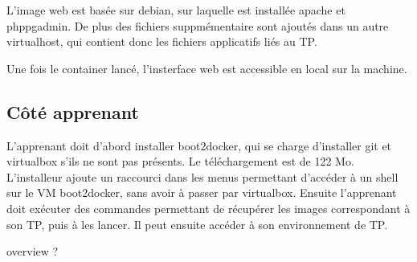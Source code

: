 \documentclass[a4paper,11pt]{report}
\begin{document}
L'image web est basée sur debian, sur laquelle est installée apache et phppgadmin. De plus des fichiers suppmémentaire sont ajoutés dans un autre virtualhost, qui contient donc les fichiers applicatifs liés au TP.

Une fois le container lancé, l'insterface web est accessible en local sur la machine.

\subsection{Côté apprenant}

L'apprenant doit d'abord installer boot2docker, qui se charge d'installer git et virtualbox s'ils ne sont pas présents. Le téléchargement est de 122 Mo. L'installeur ajoute un raccourci dans les menus permettant d'accéder à un shell sur le VM boot2docker, sans avoir à passer par virtualbox. Ensuite l'apprenant doit exécuter des commandes permettant de récupérer les images correspondant à son TP, puis à les lancer. Il peut ensuite accéder à son environnement de TP.


overview ?


\printbibliography
\end{document}
